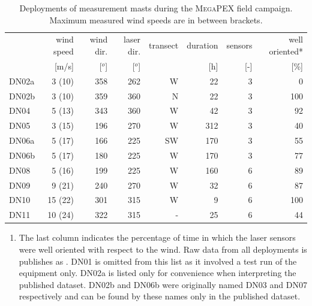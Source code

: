 \begin{table}[h]
  \centering
  \caption{Deployments of measurement masts during the \textsc{MegaPEX} field
    campaign. Maximum measured wind speeds are in between brackets.}
  \label{tab:deployments}
  \begin{tabular}[h]{lrrrrrrr}
    \hline
               & wind speed &  wind dir. & laser dir. &   transect &   duration & sensors &     well oriented* \\
               &      [m/s] &     [$^o$] &     [$^o$] &            &        [h] &     [-] &       [\%] \\
    \hline
    DN02a      &     3 (10) &        358 &        262 &          W &         22 &       3 &          0 \\
    DN02b      &     3 (10) &        359 &        360 &          N &         22 &       3 &        100 \\
    DN04       &     5 (13) &        343 &        360 &          W &         42 &       3 &         92 \\
    DN05       &     3 (15) &        196 &        270 &          W &        312 &       3 &         40 \\
    DN06a      &     5 (17) &        166 &        225 &         SW &        170 &       3 &         55 \\
    DN06b      &     5 (17) &        180 &        225 &          W &        170 &       3 &         77 \\
    DN08       &     5 (16) &        199 &        225 &          W &        160 &       6 &         89 \\
    DN09       &     9 (21) &        240 &        270 &          W &         32 &       6 &         87 \\
    DN10       &    15 (22) &        301 &        315 &          W &          9 &       6 &        100 \\
    DN11       &    10 (24) &        322 &        315 &          - &         25 &       6 &         44 \\
    \hline
  \end{tabular}

  \footnotesize{
    \begin{enumerate}[{*}]
    \item The last column indicates the percentage of time in which
      the laser sensors were well oriented with respect to the wind.
      Raw data from all deployments is publishes as \citet{megapex}.
      DN01 is omitted from this list as it involved a test run of the
      equipment only. DN02a is listed only for convenience when
      interpreting the published dataset. DN02b and DN06b were
      originally named DN03 and DN07 respectively and can be found by
      these names only in the published dataset.
    \end{enumerate}}
\end{table}

